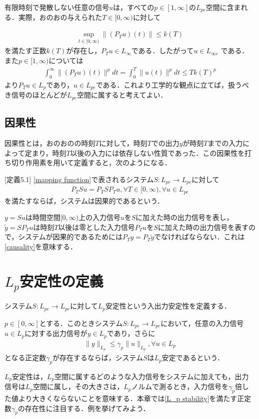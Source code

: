 \documentclass[a4paper,11pt,uplatex]{jsarticle} %
\theoremstyle{definition}	%
\begin{document}
有限時刻で発散しない任意の信号$u$は，すべての$p \in [1, \infty]$の$L_{pe}$空間に含まれる．実際，おのおの与えられた$T \in [0, \infty)$に対して

\begin{align}
\label{eq3:augmented L_pe space}
\sup_{t \in [0, \infty)} \| (P_T u) (t) \| \leq k(T)
\end{align}
を満たす正数$k(T)$が存在し，$P_T u \in L_\infty $である．したがって$u \in L_{\infty e} $ である．
また$p \in [1, \infty)$については
\begin{align}
\label{eq4:augmented L_pe space}
\int^\infty_0 \| (P_T u) (t) \| ^p dt = \int^T_0 \| u(t) \|^p dt \leq Tk(T)^p
\end{align}
より$P_T u \in L_p$であり，$u \in L_{pe}$である．これより工学的な観点に立てば，扱うべき信号のほとんどが$L_{pe}$空間に属すると考えてよい．

\subsection{因果性}
因果性とは，おのおのの時刻$T$に対して，時刻$T$での出力$y$が時刻$T$までの入力によって定まり，時刻$T$以後の入力には依存しない性質であった．この因果性を打ち切り作用素を用いて定義すると，次のようになる．

[定義5.1]
\eqref{mapping function}で表されるシステム$S: L_{pe} \to L_{pe}$に対して
\begin{align}
\label{causality}
P_T S u = P_T S P_T u, \forall T \in [0, \infty ), \forall u \in L_{pe}
\end{align}
を満たすならば，システムは因果的であるという．

$y= S u $は時間空間$[0, \infty)$上の入力信号$u$を$S$に加えた時の出力信号を表し，$\tilde{y} = S P_T u$は時刻$T$以後は零とした入力信号$P_T u $を$S$に加えた時の出力信号を表すので，システムが因果的であるためには$P_T y = P_T \tilde{y}$でなければならない．これは\eqref{causality}を意味する．

\section{$L_p$安定性の定義}
システム$S: L_{pe} \to L_{pe}$に対して$L_p$安定性という入出力安定性を定義する．

\begin{tcolorbox}[title=定義5.2,
drop small lifted shadow=black]
$p \in [0, \infty]$とする．このときシステム$S: L_{pe} \to L_{pe} $において，任意の入力信号$u \in L_p $に対する出力信号が$y \in L_p$であり，さらに
\begin{align}
\label{L_p stability}
\| y \|_{L_p} \leq \gamma_p \| u \|_{L_p} , \forall u \in L_p
\end{align}
となる正定数$\gamma_p$が存在するならば，システム$S$は$L_p$安定であるという．
\end{tcolorbox}
$L_p$安定性は，$L_p$空間に属するどのような入力信号をシステムに加えても，出力信号は$L_p$空間に属し，その大きさは，$L_p$ノルムで測るとき，入力信号を$\gamma_p$倍した値より大きくならないことを意味する．本章では\eqref{L_p stability}を満たす正定数$\gamma_p$の存在性に注目する．例を挙げてみよう．
\end{document}
